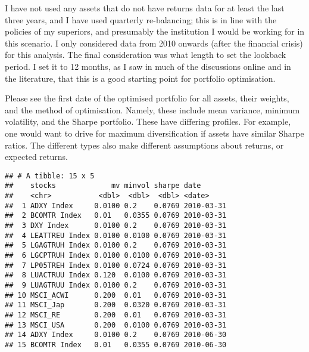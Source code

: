 \documentclass[11pt,preprint, authoryear]{elsarticle}
\numberwithin{equation}{section}
\numberwithin{figure}{section}
\numberwithin{table}{section}
\begin{document}
I have not used any assets that do not have returns data for at least
the last three years, and I have used quarterly re-balancing; this is in
line with the policies of my superiors, and presumably the institution I
would be working for in this scenario. I only considered data from 2010
onwards (after the financial crisis) for this analysis. The final
consideration was what length to set the lookback period. I set it to 12
months, as I saw in much of the discussions online and in the
literature, that this is a good starting point for portfolio
optimisation.

Please see the first date of the optimised portfolio for all assets,
their weights, and the method of optimisation. Namely, these include
mean variance, minimum volatility, and the Sharpe portfolio. These have
differing profiles. For example, one would want to drive for maximum
diversification if assets have similar Sharpe ratios. The different
types also make different assumptions about returns, or expected
returns.

\begin{verbatim}
## # A tibble: 15 x 5
##    stocks             mv minvol sharpe date      
##    <chr>           <dbl>  <dbl>  <dbl> <date>    
##  1 ADXY Index     0.0100 0.2    0.0769 2010-03-31
##  2 BCOMTR Index   0.01   0.0355 0.0769 2010-03-31
##  3 DXY Index      0.0100 0.2    0.0769 2010-03-31
##  4 LEATTREU Index 0.0100 0.0100 0.0769 2010-03-31
##  5 LGAGTRUH Index 0.0100 0.2    0.0769 2010-03-31
##  6 LGCPTRUH Index 0.0100 0.0100 0.0769 2010-03-31
##  7 LP05TREH Index 0.0100 0.0724 0.0769 2010-03-31
##  8 LUACTRUU Index 0.120  0.0100 0.0769 2010-03-31
##  9 LUAGTRUU Index 0.0100 0.2    0.0769 2010-03-31
## 10 MSCI_ACWI      0.200  0.01   0.0769 2010-03-31
## 11 MSCI_Jap       0.200  0.0320 0.0769 2010-03-31
## 12 MSCI_RE        0.200  0.01   0.0769 2010-03-31
## 13 MSCI_USA       0.200  0.0100 0.0769 2010-03-31
## 14 ADXY Index     0.0100 0.2    0.0769 2010-06-30
## 15 BCOMTR Index   0.01   0.0355 0.0769 2010-06-30
\end{verbatim}


\end{document}
